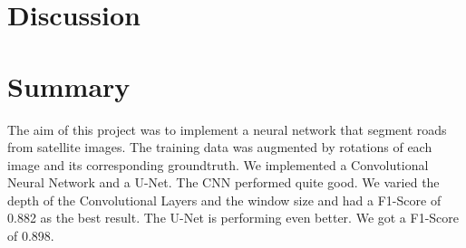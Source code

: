 \documentclass[10pt,conference,compsocconf]{IEEEtran}
\begin{document}
\vspace{0.5cm}
\section{Discussion}
\vspace{0.3cm}


\vspace{0.5cm}
\section{Summary}
\vspace{0.3cm}
The aim of this project was to implement a neural network that segment roads from satellite images. The training data was augmented by rotations of each image and its corresponding groundtruth. We implemented a Convolutional Neural Network and a U-Net. The CNN performed quite good. We varied the depth of the Convolutional Layers and the window size and had a F1-Score of 0.882 as the best result. The U-Net is performing even better. We got a F1-Score of 0.898.  







\end{document}
